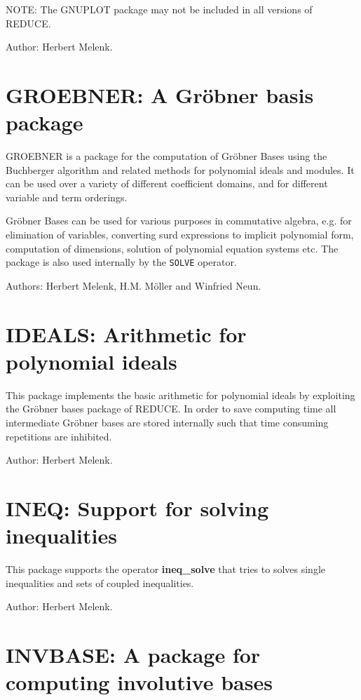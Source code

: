 NOTE: The GNUPLOT package may not be included in all versions of REDUCE.

Author: Herbert Melenk.

\section{GROEBNER: A Gr\"obner basis package} 

GROEBNER  is a package for the computation of Gr\"obner
Bases using the Buchberger algorithm and related methods
for polynomial ideals and modules.  It can be used over a variety of
different coefficient domains, and for different variable and term
orderings.

Gr\"obner Bases can be used for various purposes in commutative
algebra, e.g. for elimination of variables,
converting surd expressions to implicit polynomial form,
computation of dimensions, solution of polynomial equation systems
 etc.
The package is also used internally by the {\tt SOLVE} 
operator.

Authors: Herbert Melenk, H.M. M\"oller and Winfried Neun.

\section{IDEALS: Arithmetic for polynomial ideals} 

This package implements the basic arithmetic for polynomial ideals by
exploiting the Gr\"obner bases package of REDUCE.  In order to save
computing time all intermediate Gr\"obner bases are stored internally such
that time consuming repetitions are inhibited.

Author: Herbert Melenk.

\section{INEQ: Support for solving inequalities} 

This package supports the operator {\bf ineq\_solve} that
tries to solves single inequalities and sets of coupled inequalities.

Author: Herbert Melenk.

\section{INVBASE: A package for computing involutive bases} 

